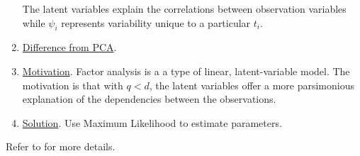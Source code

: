\begin{enumerate}
The latent variables explain the correlations between observation variables while $\psi_i$ represents variability unique to a particular $t_i$.

\item \underline{Difference from PCA}.  

\item \underline{Motivation}.  Factor analysis is a a type of linear, latent-variable model.  The motivation is that with $q<d$, the latent variables offer a more parsimonious explanation of the dependencies between the observations.


\item \underline{Solution}.  Use Maximum Likelihood to estimate parameters.


\end{enumerate}


Refer to \cite{1999_JNL_PPCA_Tipping} for more details.


